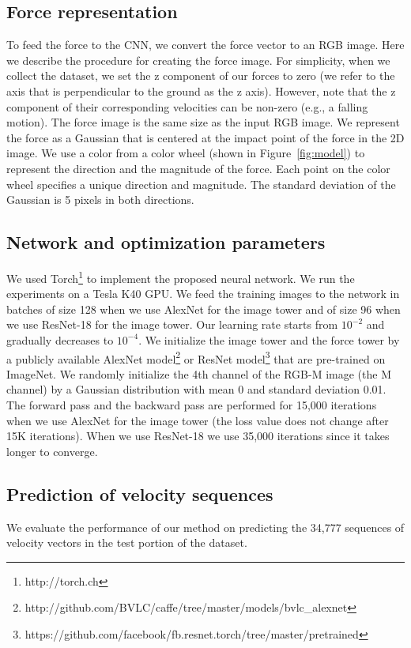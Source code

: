 \documentclass[runningheads]{llncs}
\begin{document}
\subsection{Force representation}
\label{sec:forcerep}
To feed the force to the CNN, we convert the force vector to an RGB image. Here we describe the procedure for creating the force image. For simplicity, when we collect the dataset, we set the z component of our forces to zero (we refer to the axis that is perpendicular to the ground as the z axis). However, note that the z component of their corresponding velocities can be non-zero (e.g., a falling motion). The force image is the same size as the input RGB image. We represent the force as a Gaussian that is centered at the impact point of the force in the 2D image. We use a color from a color wheel (shown in Figure~\ref{fig:model}) to represent the direction and the magnitude of the force. Each point on the color wheel specifies a unique direction and magnitude. The standard deviation of the Gaussian is 5 pixels in both directions. 


\subsection{Network and optimization parameters}

We used Torch\footnote{http://torch.ch} to implement the proposed neural network. We run the experiments on a Tesla K40 GPU. We feed the training images to the network in batches of size 128 when we use AlexNet for the image tower and of size 96 when we use ResNet-18 for the image tower. Our learning rate starts from $10^{-2}$ and gradually decreases to $10^{-4}$. We initialize the image tower and the force tower by a publicly available AlexNet model\footnote{http://github.com/BVLC/caffe/tree/master/models/bvlc\_alexnet} or ResNet model\footnote{https://github.com/facebook/fb.resnet.torch/tree/master/pretrained} that are pre-trained on ImageNet. We randomly initialize the 4th channel of the RGB-M image (the M channel) by a Gaussian distribution with mean 0 and standard deviation 0.01. The forward pass and the backward pass are performed for 15,000 iterations when we use AlexNet for the image tower (the loss value does not change after 15K iterations). When we use ResNet-18 we use 35,000 iterations since it takes longer to converge. 


\subsection{Prediction of velocity sequences}
We evaluate the performance of our method on predicting the 34,777 sequences of velocity vectors in the test portion of the dataset.
\end{document}
